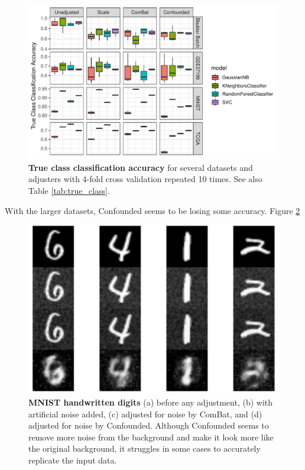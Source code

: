 \documentclass[notitlepage]{article}
\begin{document}
\begin{figure}
	\centering
	\includegraphics[width=\columnwidth]{figures/final/true_class_accuracy}
	\caption{\textbf{True class classification accuracy} for several datasets and adjusters with 4-fold cross validation repeated 10 times.
	See also Table \ref{tab:true_class}.}
	\label{fig:true_class}
\end{figure}
\begin{table}
	\centering
	
	\caption{\textbf{True class classification accuracy} for several datasets and adjusters.
	After adjustment by the ideal batch adjuster, all true class signal should be preserved, and all classifiers should therefore have the same accuracy in predicting true class before and after adjustment.
	See also Figure \ref{fig:true_class}.}
	\label{tab:true_class}
\end{table}

With the larger datasets, Confounded seems to be losing some accuracy.
Figure \ref{fig:mnist}

\begin{figure}
	\centering
	\includegraphics[width=\columnwidth]{figures/rough/mnist}
	\caption{\textbf{MNIST handwritten digits} (a) before any adjustment,
	(b) with artificial noise added,
	(c) adjusted for noise by ComBat, and
	(d) adjusted for noise by Confounded.
	Although Confounded seems to remove more noise from the background and make it look more like the original background, it struggles in some cases to accurately replicate the input data.}
	\label{fig:mnist}
\end{figure}
\end{document}
